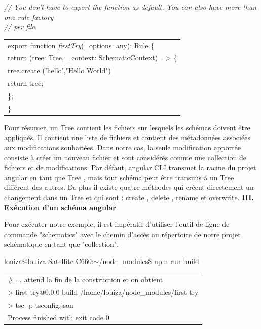 \documentclass[12pt,french]{article}
\begin{document}
	\textit{// You don't have to export the function as default. You can also have more than one rule factory}\\
	\textit{// per file}.
\newline
	
		\begin{tabular}{l}
		export function \textit{firstTry}(\_options: any): Rule \{ \\
			\quad return (tree: Tree, \_context: SchematicContext) => \{ \\
				\qquad tree.create ('hello',"Hello World")\\
				\qquad return tree;\\
			\quad\};
\\
		\}
	\end{tabular}\break

	Pour résumer, un Tree contient les fichiers sur lesquels les schémas doivent être appliqués. Il contient une liste de fichiers et contient des métadonnées associées aux modifications souhaitées. Dans notre cas, la seule modification apportée consiste à créer un nouveau fichier et sont considérés comme une collection de fichiers et de modifications.\newline
	Par défaut, angular CLI transmet la racine du projet angular en tant que Tree , mais tout schéma peut être transmis à un Tree différent des autres. De plus il existe quatre méthodes qui créent directement un changement dans un Tree et qui sont : create , delete , rename et overwrite.\newline	
	\textbf{III. Exécution d'un  schéma angular}\newline
	
	Pour exécuter notre exemple, il est impératif d'utiliser l'outil de ligne de commande "schematics" avec le chemin d'accès au répertoire de notre projet \\schématique en tant que "collection".\newline  
	
	louiza@louiza-Satellite-C660:$\sim$/node\_modules\$ npm run build \newline
	
	\begin{tabular}{l}
		\# ... attend la fin de la construction et on obtient\\ 
		\qquad > first-try@0.0.0 build /home/louiza/node\_modules/first-try\\
		\qquad > tsc -p tsconfig.json
\\
		Process finished with exit code 0
	\end{tabular}\break
\end{document}
